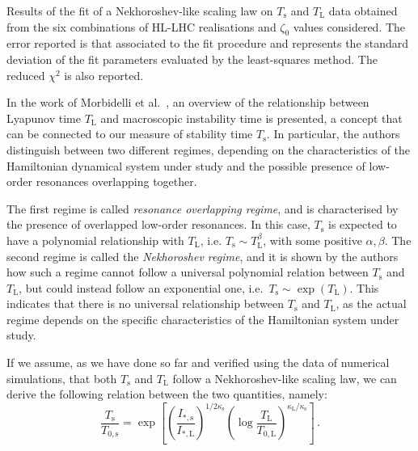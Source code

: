 \begin{table}[htb]
    \caption{Results of the fit of a Nekhoroshev-like scaling law on $T_\mathrm{s}$ and $T_\mathrm{L}$ data obtained from the six combinations of HL-LHC realisations and $\zeta_0$ values considered. The error reported is that associated to the fit procedure and represents the standard deviation of the fit parameters evaluated by the least-squares method. The reduced $\chi^2$ is also reported.}
    \label{tab:lyap_fit_results}
\end{table}

In the work of Morbidelli et al.~\cite{Morbidelli1995}, an overview of the relationship between Lyapunov time $T_\mathrm{L}$ and macroscopic instability time is presented, a concept that can be connected to our measure of stability time $T_\mathrm{s}$. In particular, the authors distinguish between two different regimes, depending on the characteristics of the Hamiltonian dynamical system under study and the possible presence of low-order resonances overlapping together.

The first regime is called \textit{resonance overlapping regime}, and is characterised by the presence of overlapped low-order resonances. In this case, $T_\mathrm{s}$ is expected to have a polynomial relationship with $T_\mathrm{L}$, i.e. $T_\mathrm{s} \sim T_\mathrm{L}^\beta$, with some positive $\alpha, \beta$. The second regime is called the \textit{Nekhoroshev regime}, and it is shown by the authors how such a regime cannot follow a universal polynomial relation between $T_\mathrm{s}$ and $T_\mathrm{L}$, but could instead follow an exponential one, i.e.\ $T_\mathrm{s} \sim \exp(T_\mathrm{L})$. This indicates that there is no universal relationship between $T_\mathrm{s}$ and $T_\mathrm{L}$, as the actual regime depends on the specific characteristics of the Hamiltonian system under study.

If we assume, as we have done so far and verified using the data of numerical simulations, that both $T_\mathrm{s}$ and $T_\mathrm{L}$ follow a Nekhoroshev-like scaling law, we can derive the following relation between the two quantities, namely:
\begin{equation}
    \frac{T_\mathrm{s}}{T_{0, \mathrm{s}}} = \exp\left[\left(\frac{I_{\ast, \mathrm{s}}}{I_{\ast, \mathrm{L}}}\right)^{1/2\kappa_\mathrm{s}}\left(\log\frac{T_\mathrm{L}}{T_{0, \mathrm{L}}}\right)^{\kappa_\mathrm{L} / \kappa_\mathrm{s}}\right] \, .
\end{equation}

